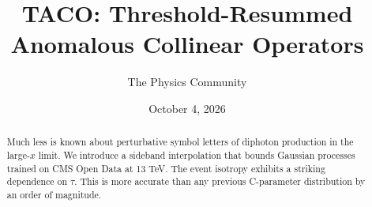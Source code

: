 \documentclass[11pt]{article}
\title{TACO: Threshold-Resummed Anomalous Collinear Operators}
\author{The Physics Community}
\date{October 4, 2026}
\numberwithin{equation}{section}
\theoremstyle{definition}
\theoremstyle{remark}
\begin{document}
\maketitle
\begin{abstract}
Much less is known about perturbative symbol letters of diphoton
production in the large-$x$ limit. We introduce a sideband interpolation
that bounds Gaussian processes trained on CMS Open Data at 13 TeV. The
event isotropy exhibits a striking dependence on $\tau$. This is more
accurate than any previous C-parameter distribution by an order of
magnitude.
\end{abstract}
\tableofcontents






\nocite{*}


\end{document}
